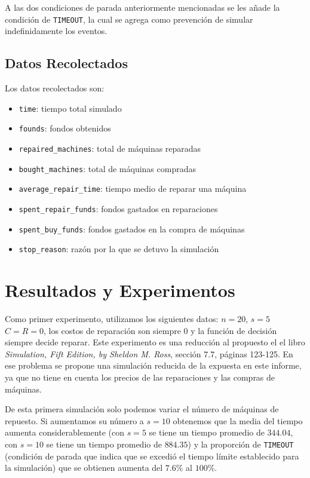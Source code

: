 \documentclass[10pt,twocolumn]{article}
\begin{document}
A las dos condiciones de parada anteriormente mencionadas se les añade la condición de \texttt{TIMEOUT}, la cual se agrega como prevención de simular indefinidamente los eventos.

\subsection{Datos Recolectados}
Los datos recolectados son:
\begin{itemize}
    \item \texttt{time}: tiempo total simulado
    \item \texttt{founds}: fondos obtenidos
    \item \texttt{repaired\_machines}: total de máquinas reparadas
    \item \texttt{bought\_machines}: total de máquinas compradas
    \item \texttt{average\_repair\_time}: tiempo medio de reparar una máquina
    \item \texttt{spent\_repair\_funds}: fondos gastados en reparaciones
    \item \texttt{spent\_buy\_funds}: fondos gastados en la compra de máquinas
    \item \texttt{stop\_reason}: razón por la que se detuvo la simulación
\end{itemize}


\section{Resultados y Experimentos}

Como primer experimento, utilizamos los siguientes datos: $n = 20$, $s = 5$ $C = R = 0$, los costos de reparación son siempre 0 y la función de decisión siempre decide reparar. Este experimento es una reducción al propuesto el el libro \textit{Simulation, Fift Edition, by Sheldon M. Ross}, sección 7.7, páginas 123-125. En ese problema se propone una simulación reducida de la expuesta en este informe, ya que no tiene en cuenta los precios de las reparaciones y las compras de máquinas.

De esta primera simulación solo podemos variar el número de máquinas de repuesto. Si aumentamos su número a $s = 10$ obtenemos que la media del tiempo aumenta considerablemente (con $s = 5$ se tiene un tiempo promedio de $344.04$, con $s = 10$ se tiene un tiempo promedio de $884.35$) y la proporción de \texttt{TIMEOUT} (condición de parada que indica que se excedió el tiempo límite establecido para la simulación) que se obtienen aumenta del $7.6\%$ al $100\%$.
\end{document}
